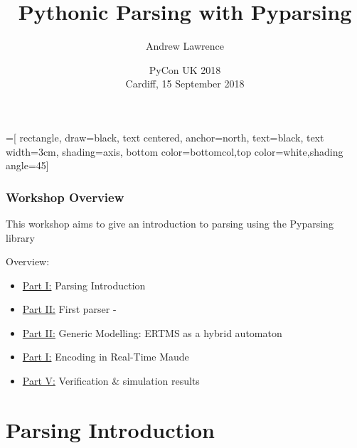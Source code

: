 \documentclass{beamer}
\title[Pythonic Parsing with Pyparsing]{Pythonic Parsing with Pyparsing}
\author[Andrew Lawrence]{Andrew Lawrence}
\date[PyCon UK, 15 September 2018]{PyCon UK 2018\\[1em]  Cardiff, 15 September 2018}
\begin{document}
=[
    rectangle,
    draw=black,
    text centered,
    anchor=north,
    text=black,
    text width=3cm,
    shading=axis,
    bottom color=bottomcol,top color=white,shading angle=45]


\begin{frame}
  \titlepage
\end{frame}


\begin{frame}

\frametitle{Workshop Overview}

\medskip
This workshop aims to give an introduction to parsing using the Pyparsing library

\medskip

Overview:


\begin{itemize}
  \item \underline{Part I:} Parsing Introduction
  \item \underline{Part II:} First parser - 
  \item \underline{Part II:} Generic Modelling: ERTMS as a hybrid automaton
  \item \underline{Part I:} Encoding in Real-Time Maude   
  \item \underline{Part V:} Verification \& simulation results
\end{itemize}

\bigskip

\end{frame}

\section{Parsing Introduction}

\end{document}
